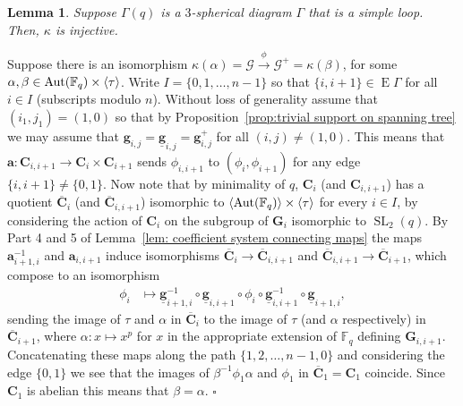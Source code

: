 \documentclass[12pt]{amsart}
\newtheorem{lemma}[theorem]{Lemma}
\theoremstyle{definition}
\newcommand{\bpf}{\noindent{\bf Proof}\hspace{7pt}}
\newcommand{\epf}{\qed}
\newcommand{\ble}{\begin{lemma}}
\newcommand{\ele}{\end{lemma}}
\newcommand{\ul}{\underline}
\newcommand{\Aut}{\mathop{\rm Aut}\nolimits}
\renewcommand{\bar}{\overline}
\DeclareMathOperator{\SL}{SL}
\newcommand{\FF}{{\mathbb F}}
\newcommand{\after}{\mathbin{ \circ }}
\newcommand{\trin}{\tau}
\renewcommand{\qed}{\hfill $\square$}
\newcommand{\amgrpC}{{\mathbf{C}}}
\newcommand{\amgrpG}{{\mathbf{G}}}
\newcommand{\ama}{{\mathbf a}}
\newcommand{\amg}{{\mathbf g}}
\newcommand{\famg}{\ul{\mathbf g}}
\newcommand{\amG}{{\mathscr{G}}}
\DeclareMathOperator{\edg}{E}
\newcommand{\liediag}{\Gamma}
\begin{document}
\ble\label{lem:classification of  CT amalgams with loop diagram}
Suppose $\liediag(q)$ is a 
$3$-spherical diagram $\liediag$ that is a simple loop. 
Then, $\kappa$ is injective.
\ele
\bpf
Suppose there is an isomorphism $\kappa(\alpha)=\amG\stackrel{\phi}{\longrightarrow} \amG^+=\kappa(\beta)$, for some  $\alpha,\beta\in \Aut(\FF_q)\times\langle \trin\rangle$.
 Write $I=\{0,1,\ldots,n-1\}$ so that $\{i,i+1\}\in \edg\liediag$ for all $i\in I$ (subscripts modulo $n$).
 Without loss of generality assume that $(i_1,j_1)=(1,0)$ so that by Proposition~\ref{prop:trivial support on spanning tree} we  may assume that $\amg_{i,j}=\famg_{i,j}=\amg^+_{i,j}$ for all $(i,j)\ne (1,0)$.
This means that  $\ama\colon \amgrpC_{i,i+1}\to \amgrpC_i\times\amgrpC_{i+1}$ sends $\phi_{i,i+1}$ to $(\phi_i,\phi_{i+1})$ for any edge $\{i,i+1\}\ne \{0,1\}$. 
Now note that by minimality of $q$, $\amgrpC_i$  (and $\amgrpC_{i,i+1}$) has a quotient $\bar{\amgrpC}_i$   (and $\bar{\amgrpC}_{i,i+1}$) isomorphic to $\langle\Aut(\FF_q)\rangle\times\langle\trin\rangle$ for every $i\in I$, by considering the action of $\amgrpC_i$ on the subgroup of $\amgrpG_i$ isomorphic to $\SL_2(q)$. 
By Part 4 and 5 of Lemma~\ref{lem: coefficient system connecting maps} the maps  $\ama_{i+1,i}^{-1}$ and $\ama_{i,i+1}$ induce isomorphisms $\bar{\amgrpC}_i\to \bar{\amgrpC}_{i,i+1}$ and $\bar{\amgrpC}_{i,i+1}\to\bar{\amgrpC}_{i+1}$, which compose to an isomorphism
\begin{align*}
\phi_i&\mapsto \famg_{i+1,i}^{-1}\after \famg_{i,i+1}\after \phi_i \after \famg_{i,i+1}^{-1}\after \famg_{i+1,i},
\end{align*}
sending the image of $\trin$ and $\alpha$ in $\bar{\amgrpC}_i$ to the image of $\trin$ (and $\alpha$ respectively) in $\bar{\amgrpC}_{i+1}$, where $\alpha\colon x\mapsto x^p$ for $x$ in the appropriate extension of $\FF_q$ defining $\amgrpG_{i,i+1}$. 
Concatenating these maps along the path $\{1,2,\ldots,n-1,0\}$ and considering the edge $\{0,1\}$ we see that the images of $\beta^{-1}\phi_1\alpha$ and $\phi_1$ in $\bar{\amgrpC}_1=\amgrpC_1$ coincide.
 Since $\amgrpC_1$ is abelian this means that $\beta=\alpha$.
\epf
\end{document}
